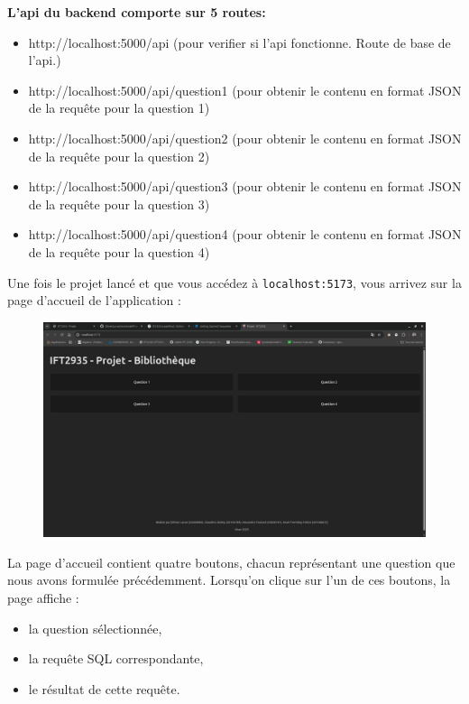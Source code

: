\documentclass{article}
\begin{document}
\textbf{L'api du backend comporte sur 5 routes: }
\begin{itemize}
    \item http://localhost:5000/api  (pour verifier si l'api fonctionne. Route de base de l'api.)
    \item http://localhost:5000/api/question1 (pour obtenir le contenu en format JSON de la requête pour la question 1)
    \item http://localhost:5000/api/question2 (pour obtenir le contenu en format JSON de la requête pour la question 2)
    \item http://localhost:5000/api/question3 (pour obtenir le contenu en format JSON de la requête pour la question 3)
    \item http://localhost:5000/api/question4 (pour obtenir le contenu en format JSON de la requête pour la question 4)
\end{itemize}

Une fois le projet lancé et que vous accédez à \texttt{localhost:5173}, vous arrivez sur la page d’accueil de l'application :
\begin{figure}[H]
    \centering
    \includegraphics[width=1\textwidth]{projetHomePage.png}
    \label{fig:}
\end{figure}

La page d’accueil contient quatre boutons, chacun représentant une question que nous avons formulée précédemment. Lorsqu’on clique sur l’un de ces boutons, la page affiche :
\begin{itemize}
    \item la question sélectionnée,
    \item la requête SQL correspondante,
    \item le résultat de cette requête.
\end{itemize}
\end{document}
